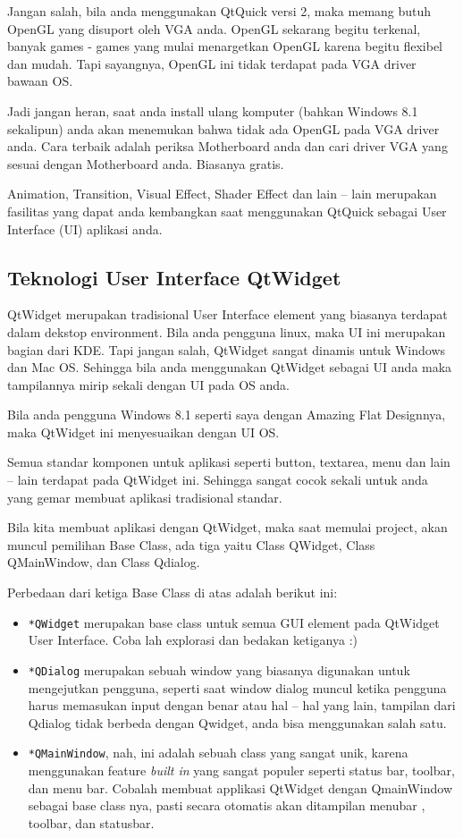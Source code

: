Jangan salah, bila anda menggunakan QtQuick versi 2, maka memang butuh
OpenGL yang disuport oleh VGA anda. OpenGL sekarang begitu terkenal,
banyak games - games yang mulai menargetkan OpenGL karena begitu
flexibel dan mudah. Tapi sayangnya, OpenGL ini tidak terdapat pada VGA
driver bawaan OS.

Jadi jangan heran, saat anda install ulang komputer (bahkan Windows 8.1
sekalipun) anda akan menemukan bahwa tidak ada OpenGL pada VGA driver
anda. Cara terbaik adalah periksa Motherboard anda dan cari driver VGA
yang sesuai dengan Motherboard anda. Biasanya gratis.

Animation, Transition, Visual Effect, Shader Effect dan lain -- lain
merupakan fasilitas yang dapat anda kembangkan saat menggunakan QtQuick
sebagai User Interface (UI) aplikasi anda.

\subsection{Teknologi User Interface
QtWidget}\label{teknologi-user-interface-qtwidget}

QtWidget merupakan tradisional User Interface element yang biasanya
terdapat dalam dekstop environment. Bila anda pengguna linux, maka UI
ini merupakan bagian dari KDE. Tapi jangan salah, QtWidget sangat
dinamis untuk Windows dan Mac OS. Sehingga bila anda menggunakan
QtWidget sebagai UI anda maka tampilannya mirip sekali dengan UI pada OS
anda.

Bila anda pengguna Windows 8.1 seperti saya dengan Amazing Flat
Designnya, maka QtWidget ini menyesuaikan dengan UI OS.

Semua standar komponen untuk aplikasi seperti button, textarea, menu dan
lain -- lain terdapat pada QtWidget ini. Sehingga sangat cocok sekali
untuk anda yang gemar membuat aplikasi tradisional standar.

Bila kita membuat aplikasi dengan QtWidget, maka saat memulai project,
akan muncul pemilihan Base Class, ada tiga yaitu Class QWidget, Class
QMainWindow, dan Class Qdialog.

Perbedaan dari ketiga Base Class di atas adalah berikut ini:

\begin{itemize}
\item
  \texttt{*QWidget} merupakan base class untuk semua GUI element pada
  QtWidget User Interface. Coba lah explorasi dan bedakan ketiganya :)
\item
  \texttt{*QDialog} merupakan sebuah window yang biasanya digunakan
  untuk mengejutkan pengguna, seperti saat window dialog muncul ketika
  pengguna harus memasukan input dengan benar atau hal -- hal yang lain,
  tampilan dari Qdialog tidak berbeda dengan Qwidget, anda bisa
  menggunakan salah satu.
\item
  \texttt{*QMainWindow}, nah, ini adalah sebuah class yang sangat unik,
  karena menggunakan feature \emph{built in} yang sangat populer seperti
  status bar, toolbar, dan menu bar. Cobalah membuat applikasi QtWidget
  dengan QmainWindow sebagai base class nya, pasti secara otomatis akan
  ditampilan menubar , toolbar, dan statusbar.
\end{itemize}

